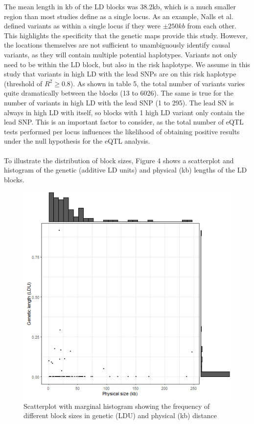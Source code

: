 \documentclass{article}
\begin{document}
The mean length in kb of the LD blocks was 38.2kb, which is a much smaller region than most studies define as a single locus. As an example, Nalls et al.\cite{Nalls2019IdentificationStudies} defined variants as within a single locus if they were $\pm 250kb$ from each other. This highlights the specificity that the genetic maps provide this study. However, the locations themselves are not sufficient to unambiguously identify causal variants, as they will contain multiple potential haplotypes. Variants not only need to be within the LD block, but also in the risk haplotype. We assume in this study that variants in high LD with the lead SNPs are on this risk haplotype (threshold of $R^2 \geq 0.8$). As shown in table 5, the total number of variants varies quite dramatically between the blocks (13 to 6026). The same is true for the number of variants in high LD with the lead SNP (1 to 295). The lead SN is always in high LD with itself, so blocks with 1 high LD variant only contain the lead SNP. This is an important factor to consider, as  the total number of eQTL tests performed per locus influences the likelihood of obtaining positive results under the null hypothesis for the eQTL analysis. 
\\
\\To illustrate the distribution of block sizes, Figure 4 shows a scatterplot and histogram of the genetic (additive LD units) and physical (kb) lengths of the LD blocks.
\begin{figure}[!h]
    \centering
    \includegraphics[width=1\linewidth]{Thesis/thesis images/blockscatter.png}
    \caption{Scatterplot with marginal histogram showing the frequency of different block sizes in genetic (LDU) and physical (kb) distance}
    \label{fig:blockscatter}
\end{figure}
\end{document}

